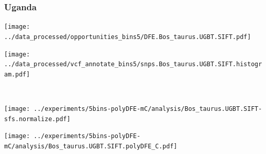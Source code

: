\subsubsection{Uganda}

\begin{minipage}{0.49\linewidth}
    \texttt{[image: ../data\_processed/opportunities\_bins5/DFE.Bos\_taurus.UGBT.SIFT.pdf]}
\end{minipage}
\begin{minipage}{0.49\linewidth}
    \texttt{[image: ../data\_processed/vcf\_annotate\_bins5/snps.Bos\_taurus.UGBT.SIFT.histogram.pdf]}
\end{minipage}
\\
\begin{minipage}{0.49\linewidth}
    \texttt{[image: ../experiments/5bins-polyDFE-mC/analysis/Bos\_taurus.UGBT.SIFT-sfs.normalize.pdf]}
\end{minipage}
\begin{minipage}{0.4\linewidth}
    \texttt{[image: ../experiments/5bins-polyDFE-mC/analysis/Bos\_taurus.UGBT.SIFT.polyDFE\_C.pdf]}
\end{minipage}
